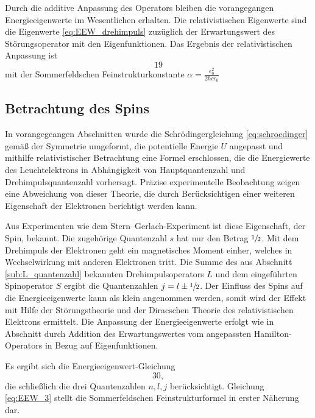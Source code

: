 Durch die additive Anpassung des Operators bleiben die vorangegangen Energieeigenwerte im Wesentlichen erhalten.
Die relativistischen Eigenwerte sind die Eigenwerte \eqref{eq:EEW_drehimpuls} zuzüglich der Erwartungswert des Störungsoperator mit den Eigenfunktionen.
Das Ergebnis der relativistischen Anpassung ist
\begin{equation}
	19
	\label{eq:EEW_rel}
\end{equation}
mit der Sommerfeldschen Feinstrukturkonstante $\alpha=\frac{e_0^2}{2hc\epsilon_0}$

\subsection{Betrachtung des Spins} %
\label{sub:spin}
In vorangegeangen Abschnitten wurde die Schrödingergleichung \eqref{eq:schroedinger} gemäß der Symmetrie umgeformt, die potentielle Energie $U$ angepasst und mithilfe relativistischer Betrachtung eine Formel erschlossen, die die Energiewerte des Leuchtelektrons in Abhängigkeit von Hauptquantenzahl und Drehimpulsquantenzahl vorhersagt.
Präzise experimentelle Beobachtung zeigen eine Abweichung von dieser Theorie, die durch Berücksichtigen einer weiteren Eigenschaft der Elektronen berichtigt werden kann.

Aus Experimenten wie dem Stern--Gerlach-Experiment ist diese Eigenschaft, der Spin, bekannt.
Die zugehörige Quantenzahl $s$ hat nur den Betrag $\sfrac{1}{2}$.
Mit dem Drehimpuls der Elektronen geht ein magnetisches Moment einher, welches in Wechselwirkung mit anderen Elektronen tritt.
Die Summe des aus Abschnitt \ref{sub:L_quantenzahl} bekannten Drehimpulsoperators $L$ und dem eingeführten Spinoperator $S$ ergibt die Quantenzahlen
$j=l\pm\sfrac{1}{2}$.
Der Einfluss des Spins auf die Energieeigenwerte kann als klein angenommen werden, somit wird der Effekt mit Hilfe der Störungstheorie und der Diracschen Theorie des relativistischen Elektrons ermittelt.
Die Anpassung der Energieeigenwerte erfolgt wie in Abschnitt \label{sub:rel} durch Addition des Erwartungswertes vom angepassten Hamilton-Operators in Bezug auf Eigenfunktionen.

Es ergibt sich die Energieeigenwert-Gleichung
\begin{equation}
	30,
	\label{eq:EEW_3}
\end{equation}
die schließlich die drei Quantenzahlen $n,l,j$ berücksichtigt.
Gleichung \eqref{eq:EEW_3} stellt die Sommerfeldschen Feinstrukturformel in erster Näherung dar.

